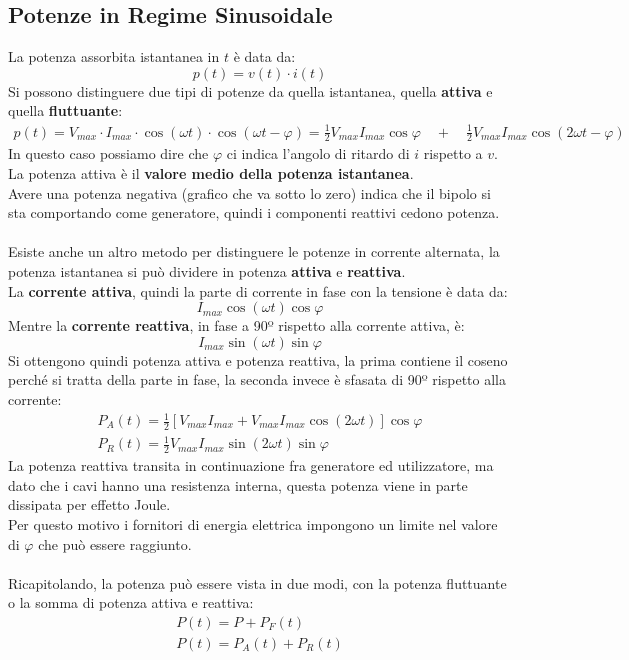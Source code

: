 \documentclass[../main.tex]{subfiles}
\begin{document}
	\subsection{Potenze in Regime Sinusoidale}
	La potenza assorbita istantanea in $t$ è data da:
	\begin{equation}
		p(t)=v(t)\cdot i(t)	
	\end{equation}
	Si possono distinguere due tipi di potenze da quella istantanea, quella \textbf{attiva} e quella \textbf{fluttuante}:
	\begin{gather}
		p(t)=V_{max}\cdot I_{max} \cdot \cos(\omega t) \cdot \cos (\omega t - \varphi)
		= \frac{1}{2}V_{max} I_{max} \cos \varphi \quad + \quad \frac{1}{2}V_{max}I_{max} \cos (2\omega t - \varphi)
	\end{gather}
	In questo caso possiamo dire che $\varphi$ ci indica l'angolo di ritardo di $i$ rispetto a $v$.\\
	La potenza attiva è il \textbf{valore medio della potenza istantanea}.\\
	Avere una potenza negativa (grafico che va sotto lo zero) indica che il bipolo si sta comportando come generatore, quindi i componenti reattivi cedono potenza.\\\\
	Esiste anche un altro metodo per distinguere le potenze in corrente alternata, la potenza istantanea si può dividere in potenza \textbf{attiva} e \textbf{reattiva}.\\
	La \textbf{corrente attiva}, quindi la parte di corrente in fase con la tensione è data da:
	\begin{equation}
		I_{max}\cos (\omega t ) \cos \varphi	
	\end{equation}
	Mentre la \textbf{corrente reattiva}, in fase a 90º rispetto alla corrente attiva, è:
	\begin{equation}
		I_{max}\sin (\omega t) \sin \varphi	
	\end{equation}
	Si ottengono quindi potenza attiva e potenza reattiva, la prima contiene il coseno perché si tratta della parte in fase, la seconda invece è sfasata di 90º rispetto alla corrente:
	\begin{gather}
		\boxed{P_A(t)=\frac{1}{2} \left[ V_{max}I_{max}+V_{max}I_{max}\cos (2\omega t) \right] \cos \varphi} \\
		\boxed{P_R(t)=\frac{1}{2}V_{max}I_{max} \sin(2\omega t) \sin \varphi}
	\end{gather}
	La potenza reattiva transita in continuazione fra generatore ed utilizzatore, ma dato che i cavi hanno una resistenza interna, questa potenza viene in parte dissipata per effetto Joule.\\
	Per questo motivo i fornitori di energia elettrica impongono un limite nel valore di $\varphi$ che può essere raggiunto.\\\\
	Ricapitolando, la potenza può essere vista in due modi, con la potenza fluttuante o la somma di potenza attiva e reattiva:
	\begin{gather}
		P(t)=P+P_F(t) \\
		P(t)=P_A(t)+P_R(t)
	\end{gather}
\end{document}
